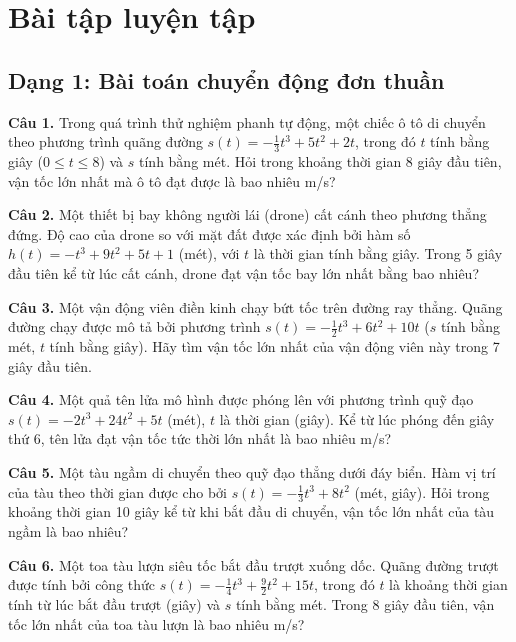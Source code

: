 \documentclass[12pt]{article}
\begin{document}
	\section{Bài tập luyện tập}
	
	\subsection{Dạng 1: Bài toán chuyển động đơn thuần}
	\noindent \textbf{Câu 1.} Trong quá trình thử nghiệm phanh tự động, một chiếc ô tô di chuyển theo phương trình quãng đường $s(t) = -\frac{1}{3}t^3 + 5t^2 + 2t$, trong đó $t$ tính bằng giây ($0 \le t \le 8$) và $s$ tính bằng mét. Hỏi trong khoảng thời gian 8 giây đầu tiên, vận tốc lớn nhất mà ô tô đạt được là bao nhiêu m/s?
	
	\vspace{0.5cm}
	\noindent \textbf{Câu 2.} Một thiết bị bay không người lái (drone) cất cánh theo phương thẳng đứng. Độ cao của drone so với mặt đất được xác định bởi hàm số $h(t) = -t^3 + 9t^2 + 5t + 1$ (mét), với $t$ là thời gian tính bằng giây. Trong 5 giây đầu tiên kể từ lúc cất cánh, drone đạt vận tốc bay lớn nhất bằng bao nhiêu?
	
	\vspace{0.5cm}
	\noindent \textbf{Câu 3.} Một vận động viên điền kinh chạy bứt tốc trên đường ray thẳng. Quãng đường chạy được mô tả bởi phương trình $s(t) = -\frac{1}{2}t^3 + 6t^2 + 10t$ ($s$ tính bằng mét, $t$ tính bằng giây). Hãy tìm vận tốc lớn nhất của vận động viên này trong 7 giây đầu tiên.
	
	\vspace{0.5cm}
	\noindent \textbf{Câu 4.} Một quả tên lửa mô hình được phóng lên với phương trình quỹ đạo $s(t) = -2t^3 + 24t^2 + 5t$ (mét), $t$ là thời gian (giây). Kể từ lúc phóng đến giây thứ 6, tên lửa đạt vận tốc tức thời lớn nhất là bao nhiêu m/s?
	
	\vspace{0.5cm}
	\noindent \textbf{Câu 5.} Một tàu ngầm di chuyển theo quỹ đạo thẳng dưới đáy biển. Hàm vị trí của tàu theo thời gian được cho bởi $s(t) = -\frac{1}{3}t^3 + 8t^2$ (mét, giây). Hỏi trong khoảng thời gian 10 giây kể từ khi bắt đầu di chuyển, vận tốc lớn nhất của tàu ngầm là bao nhiêu?
	
	\vspace{0.5cm}
	\noindent \textbf{Câu 6.} Một toa tàu lượn siêu tốc bắt đầu trượt xuống dốc. Quãng đường trượt được tính bởi công thức $s(t) = -\frac{1}{4}t^3 + \frac{9}{2}t^2 + 15t$, trong đó $t$ là khoảng thời gian tính từ lúc bắt đầu trượt (giây) và $s$ tính bằng mét. Trong 8 giây đầu tiên, vận tốc lớn nhất của toa tàu lượn là bao nhiêu m/s?
	
\end{document}
